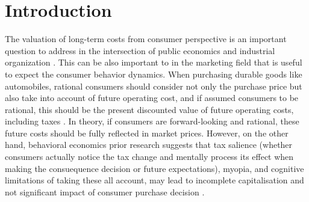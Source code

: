 \documentclass[12pt, a4paper]{article}
\begin{document}
\section{Introduction}
The valuation of long-term costs from consumer perspective is an important question to address in the intersection of public economics and industrial organization \citep{grigolon2018, allcott2014, sallee2016, chetty2009}. This can be also important to in the marketing field that is useful to expect the consumer behavior dynamics. When purchasing durable goods like automobiles, rational consumers should consider not only the purchase price but also take into account of future operating cost, and if assumed consumers to be rational, this should be the present discounted value of future operating costs, including taxes \citep{grigolon2018, allcott2014, sallee2016}. 
In theory, if consumers are forward-looking and rational, these future costs should be fully reflected in market prices. However, on the other hand, behavioral economics prior research suggests that tax salience (whether consumers actually notice the tax change and mentally process its effect when making the consuequence decision or future expectations), myopia, and cognitive limitations of taking these all account, may lead to incomplete capitalisation and not significant impact of consumer purchase decision \citep{chetty2009, finkelstein2009}.
\end{document}
